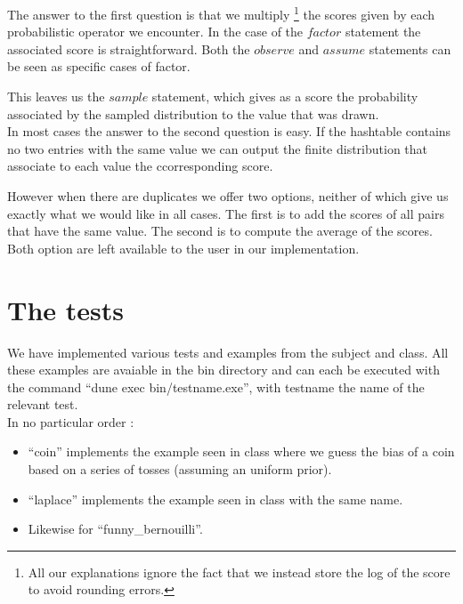 \documentclass{article}
\begin{document}
	The answer to the first question is that we multiply 
	\footnote{All our explanations ignore the fact that we instead store the log of the score to avoid rounding errors.}
	the scores given by each probabilistic operator we encounter.
	In the case of the $factor$ statement the associated score is straightforward. 
	Both the $observe$ and $assume$ statements can be seen as specific cases of factor.

	This leaves us the $sample$ statement, which gives as a score the probability associated by the sampled distribution to the value that was drawn. \\

	In most cases the answer to the second question is easy. 
	If the hashtable contains no two entries with the same value we can output the finite distribution that associate to each value the ccorresponding score.

	However when there are duplicates we offer two options, neither of which give us exactly what we would like in all cases.
	The first is to add the scores of all pairs that have the same value.
	The second is to compute the average of the scores.
	Both option are left available to the user in our implementation. \\

\section{The tests}

	We have implemented various tests and examples from the subject and class.
	All these examples are avaiable in the bin directory and can each be executed with the command ``dune exec bin/testname.exe'', with testname the name of the relevant test. \\

	In no particular order : 

	\begin{itemize}
	  \item ``coin'' implements the example seen in class where we guess the bias of a coin based on a series of tosses (assuming an uniform prior).
	  \item ``laplace'' implements the example seen in class with the same name.
	  \item Likewise for ``funny\_bernouilli''.
	\end{itemize}
	
\end{document}
